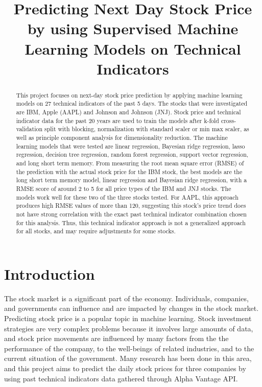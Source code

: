 \documentclass[conference]{IEEEtran}
\begin{document}
\title{Predicting Next Day Stock Price by using Supervised Machine Learning Models on Technical Indicators\\
}

\author{
}

\maketitle

\begin{abstract}
This project focuses on next-day stock price prediction by applying machine learning models on 27 technical indicators of the past 5 days. The stocks that were investigated are IBM, Apple (AAPL) and Johnson and Johnson (JNJ). Stock price and technical indicator data for the past 20 years are used to train the models after k-fold cross-validation split with blocking, normalization with standard scaler or min max scaler, as well as principle component analysis for dimensionality reduction. The machine learning models that were tested are linear regression, Bayesian ridge regression, lasso regression, decision tree regression, random forest regression, support vector regression, and long short term memory. From measuring the root mean square error (RMSE) of the prediction with the actual stock price for the IBM stock, the best models are the long short term memory model, linear regression and Bayesian ridge regression, with a RMSE score of around 2 to 5 for all price types of the IBM and JNJ stocks. The models work well for these two of the three stocks tested. For AAPL, this approach produces high RMSE values of more than 120, suggesting this stock's price trend does not have strong correlation with the exact past technical indicator combination chosen for this analysis. Thus, this technical indicator approach is not a generalized approach for all stocks, and may require adjustments for some stocks.
\end{abstract}

\section{Introduction}
The stock market is a significant part of the economy. Individuals, companies, and governments can influence and are impacted by changes in the stock market. Predicting stock price is a popular topic in machine learning. Stock investment strategies are very complex problems because it involves large amounts of data, and stock price movements are influenced by many factors from the the performance of the company, to the well-beings of related industries, and to the current situation of the government. Many research has been done in this area, and this project aims to predict the daily stock prices for three companies by using past technical indicators data gathered through Alpha Vantage API.
\end{document}
